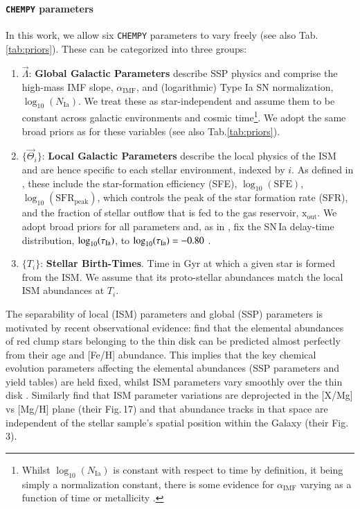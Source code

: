 \documentclass{aa}
\begin{document}
\paragraph{\texttt{CHEMPY} parameters}
In this work, we allow six \texttt{CHEMPY} parameters to vary freely (see also Tab.\,\ref{tab:priors}). These can be categorized into three groups:
\begin{enumerate}
     \item $\vec\Lambda$: \textbf{Global Galactic Parameters} describe SSP physics and comprise the high-mass \citet{2003PASP..115..763C} IMF slope, $\alpha_\mathrm{IMF}$, and (logarithmic) Type Ia SN normalization, $\log_{10}(N_\mathrm{Ia})$. We treat these as star-independent and assume them to be constant across galactic environments and cosmic time\footnote{Whilst $\log_{10}(N_\mathrm{Ia})$ is constant with respect to time by definition, it being simply a normalization constant, there is some evidence for $\alpha_\mathrm{IMF}$ varying as a function of time or metallicity \citep{Chabrier2014,2016MNRAS.462.2832C,2019MNRAS.482..118G,Martin2019}.}. 
     We adopt the same broad priors as \citep{Philcox_2019} for these variables (see also Tab.\ref{tab:priors}). 
     \item $\{\vec\Theta_i\}$: \textbf{Local Galactic Parameters} describe the local physics of the ISM and are hence specific to each stellar environment, indexed by $i$. As defined in \citep{Rybizki_2017}, these include the star-formation efficiency (SFE), $\log_{10}(\text{SFE})$, $\log_{10}(\mathrm{SFR}_\mathrm{peak})$, which controls the peak of the star formation rate (SFR), and the fraction of stellar outflow that is fed to the gas reservoir, $\mathrm{x}_\mathrm{out}$. We adopt broad priors for all parameters and, as in \citep{Philcox_2019}, fix the SN\,Ia delay-time distribution, $\log_{10}(\tau_{\rm Ia})$, to $\log_{10}(\tau_{\rm Ia})=-0.80$ \citep[see also][]{Philcox_2018}.
     \item $\{T_i\}$: \textbf{Stellar Birth-Times}. Time in Gyr at which a given star is formed from the ISM. We assume that its proto-stellar abundances match the local ISM abundances at $T_i$.
\end{enumerate}

The separability of local (ISM) parameters and global (SSP) parameters is motivated by recent observational evidence: \citet{2019arXiv190710606N} find that the elemental abundances of red clump stars belonging to the thin disk can be predicted almost perfectly from their age and [Fe/H] abundance. This implies that the key chemical evolution parameters affecting the elemental abundances (SSP parameters and yield tables) are held fixed, whilst ISM parameters vary smoothly over the thin disk \citep[which offsets the metallicity for different galactocentric radii, e.g.][for a simulated example]{Buck2020, Wang2024}. Similarly \cite{2019ApJ...874..102W} find that ISM parameter variations are deprojected in the [X/Mg] vs [Mg/H] plane (their Fig.\,17) and that abundance tracks in that space are independent of the stellar sample's spatial position within the Galaxy (their Fig.\,3).
\end{document}
